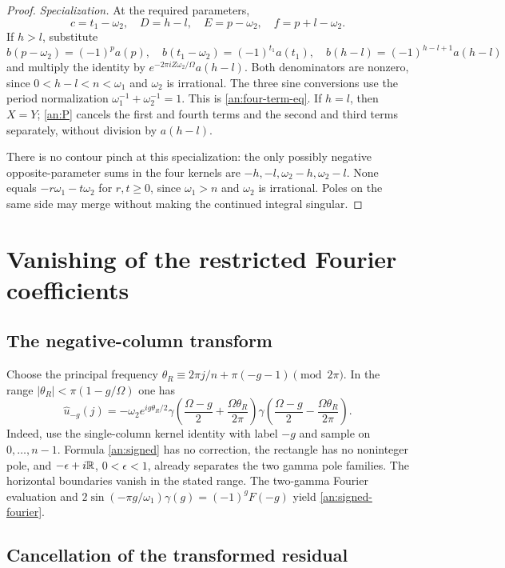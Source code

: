 \begin{proof}
\emph{Specialization.}
At the required parameters,
\[
 c=t_1-\omega_2,\quad D=h-l,\quad E=p-\omega_2,\quad f=p+l-\omega_2.
\]
If $h>l$, substitute
\[
 b(p-\omega_2)=(-1)^pa(p),\quad b(t_1-\omega_2)=(-1)^{t_1}a(t_1),\quad
 b(h-l)=(-1)^{h-l+1}a(h-l)
\]
and multiply the identity by $e^{-2\pi iZ\omega_2/\Omega}a(h-l)$.
Both denominators are nonzero, since $0<h-l<n<\omega_1$ and
$\omega_2$ is irrational.  The three sine conversions use the period
normalization $\omega_1^{-1}+\omega_2^{-1}=1$.
This is \eqref{an:four-term-eq}.  If $h=l$, then $X=Y$;
\eqref{an:P} cancels the first and fourth terms and the second
and third terms separately, without division by $a(h-l)$.

There is no contour pinch at this specialization: the only possibly
negative opposite-parameter sums in the four kernels are
$-h,-l,\omega_2-h,\omega_2-l$.  None equals
$-r\omega_1-t\omega_2$ for $r,t\ge0$, since $\omega_1>n$ and
$\omega_2$ is irrational.  Poles on the same side may merge without
making the continued integral singular.
\end{proof}

\section{Vanishing of the restricted Fourier coefficients}
\label{an:vanishing-section}

\subsection{The negative-column transform}

Choose the principal frequency
$\theta_R\equiv2\pi j/n+\pi(-g-1)\pmod{2\pi}$.
In the range $|\theta_R|<\pi(1-g/\Omega)$ one has
\begin{equation}
 \widehat u_{-g}(j)=-\omega_2 e^{ig\theta_R/2}
  \gamma\left(\frac{\Omega-g}{2}+\frac{\Omega\theta_R}{2\pi}\right)
  \gamma\left(\frac{\Omega-g}{2}-\frac{\Omega\theta_R}{2\pi}\right).
 \label{an:signed-fourier}
\end{equation}
Indeed, use the single-column kernel identity with label $-g$ and
sample on $0,\ldots,n-1$.  Formula \eqref{an:signed} has no correction,
the rectangle has no noninteger pole, and
$-\epsilon+i\mathbb R$, $0<\epsilon<1$, already separates the
two gamma pole families.  The horizontal boundaries vanish in the
stated range.  The two-gamma Fourier evaluation and
$2\sin(-\pi g/\omega_1)\gamma(g)=(-1)^gF(-g)$ yield
\eqref{an:signed-fourier}.

\subsection{Cancellation of the transformed residual}

